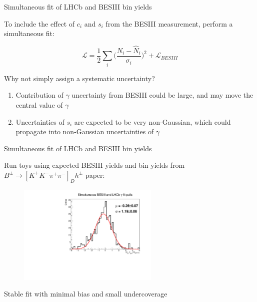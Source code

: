 \documentclass[xcolor={dvipsnames}]{beamer}
\begin{document}
\begin{frame}{Simultaneous fit of LHCb and BESIII bin yields}
  \begin{center}
    \Large To include the effect of $c_i$ and $s_i$ from the BESIII measurement, perform a simultaneous fit:
  \end{center}
  \begin{equation*}
    \mathcal{L} = \frac{1}{2}\sum_i\Big(\frac{N_i - \hat{N}_i}{\sigma_i}\Big)^2 + \mathcal{L}_{BESIII}
  \end{equation*}
  \vspace{-0.2cm}
  \begin{center}
    \large Why not simply assign a systematic uncertainty?
  \end{center}
  \begin{enumerate}
    \setlength\itemsep{1.0em}
    \item{Contribution of $\gamma$ uncertainty from BESIII could be large, and may move the central value of $\gamma$}
    \item{Uncertainties of $s_i$ are expected to be very non-Gaussian, which could propagate into non-Gaussian uncertainties of $\gamma$}
  \end{enumerate}
\end{frame}

\begin{frame}{Simultaneous fit of LHCb and BESIII bin yields}
  \begin{center}
    \Large Run toys using expected BESIII yields and bin yields from $B^\pm\to[K^+K^-\pi^+\pi^-]_Dh^\pm$ paper:
  \end{center}
  \vspace{-0.1cm}
  \begin{figure}[htb]
    \centering
    \includegraphics[width=0.6\textwidth]{Plots/Gamma_SimultaneousFit_pull.pdf}
  \end{figure}
  \begin{center}
    \large Stable fit with minimal bias and small undercoverage
  \end{center}
\end{frame}
\end{document}
